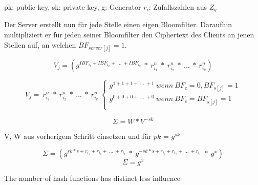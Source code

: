 pk: public key, sk: private key, g: Generator $r_i$: Zufallszahlen aus $Z_q$ 

Der Server erstellt nun für jede Stelle einen eigen Bloomfilter.
Daraufhin multipliziert er für jeden seiner Bloomfilter den Ciphertext des Clients an jenen Stellen auf, an welchen  $BF_{server[j]} = 1$.	

$$ V_{j} = (g^{ IBF_{i_{1}} + IBF_{i_{2}} + \ ...\ +IBF_{i_{k}}} \ * \ r_{i_{1}}^{n} \ * \ r_{i_{2}}^{n} \ * \ ...\ * \  r_{i_{k}}^{n})$$

\[
V_{j} = \ r_{i_{1}}^{n} \ * \ r_{i_{2}}^{n} \ * \ ...\ * \  r_{i_{k}}^{n} \ \left\{
\begin{array}{ll}
g^{1 + 1 + 1 + \ ...\ +1} \ wenn \ BF_{c} = 0,BF_{s[j]} = 1 \\
g^{0 + 0 + 0 + \ ...\ +0} \ wenn \ BF_{c} = BF_{s[j]} = 1\\
\end{array}
\right.
\]




$$\Sigma = W * V^{-sk}$$

V, W aus vorherigem Schritt einsetzen und für $pk$ = $g^{sk}$ 

\vskip 0.1cm 

$$\Sigma = (g^{sk * s + r_{i_{1}} + r_{i_{2}} + \ ...\ +r_{i_{k}}} \ * \ g^{-sk * s + r_{i_{1}} + r_{i_{2}} + \ ...\ +r_{i_{k}}} \ * \ g^x) $$
$$\Sigma = g^x$$




The number of hash functions has distinct less influence 







